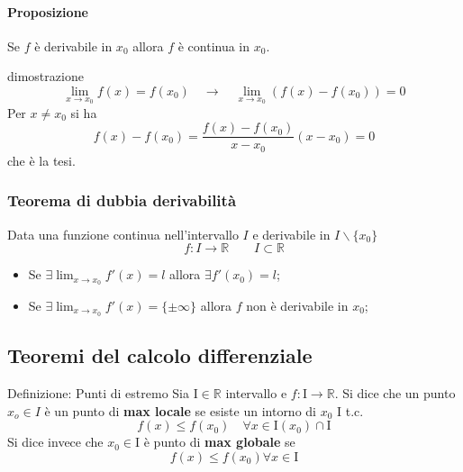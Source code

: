 \documentclass[x11names]{article}
\begin{document}
	\paragraph{Proposizione} Se $f$ è derivabile in $x_0$ allora $f$ è continua in $x_0$.
	\begin{es}{dimostrazione}
		\[
		\lim_{x \to x_0}f(x) = f(x_0) \quad \to \quad \lim_{x \to x_0}\left(f(x) - f(x_0)\right) = 0
		\]
		Per $x \neq x_0$ si ha
		\[
		f(x) -f(x_0) = \frac{f(x) - f(x_0)}{x-x_0}(x-x_0) = 0
		\]
		che è la tesi.
	\end{es}
	
	\begin{center}
		\colorbox{myred}{\begin{minipage}{5.75in}
				\begin{redes}{}
					\subsubsection{Teorema di dubbia derivabilità}
					Data una funzione continua nell'intervallo $I$ e derivabile in $I \backslash\{x_0\}$
					\[
					f: I \to \mathbb{R} \qquad I \subset \mathbb{R}
					\]
					\begin{itemize}
						\item Se $\exists \lim_{x \to x_0}f'(x) = l$ allora $\exists f'(x_0) = l$;
						\item Se $\exists \lim_{x \to x_0}f'(x) = \{\pm \infty\}$ allora $f$ non è derivabile in $x_0$;
					\end{itemize}
				\end{redes}
		\end{minipage}}        
	\end{center}
	
	\subsection{Teoremi del calcolo differenziale}
		\begin{center}
		\colorbox{myblue}{\begin{minipage}{5.75in}
				\begin{blues}{Definizione: Punti di estremo}
					Sia I$\in \mathbb{R}$ intervallo e $f: \text{I}\to \mathbb{R}$. Si dice che un punto $x_o \in I$ è un punto di \textbf{max locale} se esiste un intorno di $x_0$ $\text{I}$ t.c.
					\[
					f(x) \leq f(x_0) \quad \forall x \in \text{I}(x_0) \cap \text{I}
					\]
					Si dice invece che $x_0 \in \text{I}$ è punto di \textbf{max globale} se
					\[
					f(x) \leq f(x_0) \forall x \in \text{I}
					\]
				\end{blues}
		\end{minipage}}       
	\end{center}
	
\end{document}
